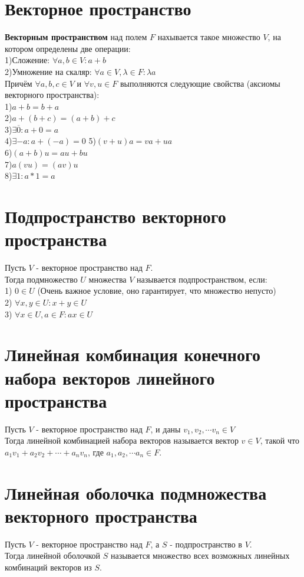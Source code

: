 \documentclass[a4paper,11pt]{report}
\begin{document}
\section{Векторное пространство}
\textbf{Векторным пространством} над полем $F$ нахывается такое множество $V$, на котором определены две операции:\\
1)Сложение: $\forall a, b \in V: a + b$\\
2)Умножение на скаляр: $\forall a \in V, \lambda \in F: \lambda{a} $\\
Причём $\forall a, b, c \in V$ и $\forall v, u \in F$ выполняются следующие свойства (аксиомы векторного пространства):\\
1)$a + b = b+ a$\\
2)$a + (b +c) = (a + b) + c $\\
3)$\exists \overline{0}: a + 0 = a$\\
4)$\exists -a: a + (-a) = 0$
5)$(v + u)a = va + ua$\\
6)$(a + b)u = au + bu$\\
7)$a(vu) = (av)u$\\
8)$\exists 1: a * 1 = a $\\
\section{Подпространство векторного пространства}
Пусть $V$ - векторное пространство над $F$.\\
Тогда подмножество $U$ множества $V$ называется подпространством, если:\\
1) $0 \in U$ (Очень важное условие, оно гарантирует, что множество непусто)\\ 
2) $\forall x, y \in U: x + y \in U$\\
3) $\forall x \in U, a \in F: ax \in U$\\
\section{Линейная комбинация конечного набора векторов линейного пространства}
Пусть $V$ - векторное пространство над $F$, и даны $v_1, v_2, \cdots v_n \in V$\\
Тогда линейной комбинацией набора векторов называется вектор $v \in V$, такой что
$a_1v_1 + a_2v_2 + \cdots + a_nv_n$, где $a_1, a_2, \cdots a_n \in F$.
\section{Линейная оболочка подмножества векторного пространства}
Пусть $V$ - векторное пространство над $F$, а $S$ - подпространство в $V$.\\
Тогда линейной оболочкой $S$ называется множество всех возможных линейных комбинаций
векторов из $S$.
\end{document}
